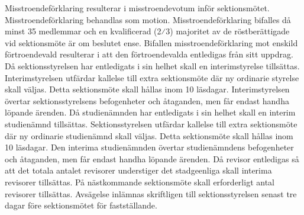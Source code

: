 \documentclass[a4paper]{dtek}
\begin{document}
\para Misstroendeförklaring resulterar i misstroendevotum inför sektionsmötet. Misstroendeförklaring behandlas som motion.
\para Misstroendeförklaring bifalles då minst 35 medlemmar och en kvalificerad (2⁄3) majoritet av de röstberättigade vid sektionsmöte är om beslutet ense.
\para Bifallen misstroendeförklaring mot enskild förtroendevald resulterar i att den förtroendevalda entledigas från sitt uppdrag.
\para Då sektionsstyrelsen har entledigats i sin helhet skall en interimstyrelse tillsättas. Interimstyrelsen utfärdar kallelse till extra sektionsmöte där ny ordinarie styrelse skall väljas. Detta sektionsmöte skall hållas inom 10 läsdagar. Interimstyrelsen övertar sektionsstyrelsens befogenheter och åtaganden, men får endast handha löpande ärenden.
\para Då studienämnden har entledigats i sin helhet skall en interim studienämnd tillsättas. Sektionsstyrelsen utfärdar kallelse till extra sektionsmöte där ny ordinarie studienämnd skall väljas. Detta sektionsmöte skall hållas inom 10 läsdagar. Den interima studienämnden övertar studienämndens befogenheter och åtaganden, men får endast handha löpande ärenden.
\para Då revisor entledigas så att det totala antalet revisorer understiger det stadgeenliga skall interima revisorer tillsättas. På nästkommande sektionsmöte skall erforderligt antal revisorer tillsättas.
\para[Avsägelse] Avsägelse inlämnas skriftligen till sektionsstyrelsen senast tre dagar före sektionsmötet för fastställande.

\end{document}
